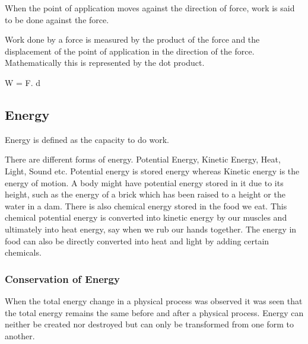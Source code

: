 \documentclass[12pt]{book}
\begin{document}
When the point of application moves against the direction of force, work is said to be done against the force.

Work done by a force is measured by the product of the force and the displacement of the point of application in the direction of the force.
Mathematically this is represented by the dot product.

W = F. d

\subsection*{Energy}
Energy is defined as the capacity to do work.

There are different forms of energy.
Potential Energy, Kinetic Energy, Heat, Light, Sound etc.
Potential energy is stored energy whereas Kinetic energy is the energy of motion.
A body might have potential energy stored in it due to its height, such as the energy
of a brick which has been raised to a height or the water in a dam. There is also
chemical energy stored in the food we eat. This chemical potential energy is converted into kinetic energy by our muscles and ultimately into heat energy, say when we rub our hands together. The energy in food can also be directly converted into heat and light by adding certain chemicals.

\subsubsection{Conservation of Energy}
When the total energy change in a physical process was observed it was seen that
the total energy remains the same before and after a physical process.
Energy can neither be created nor destroyed but can only be transformed from one form to another.
\end{document}

